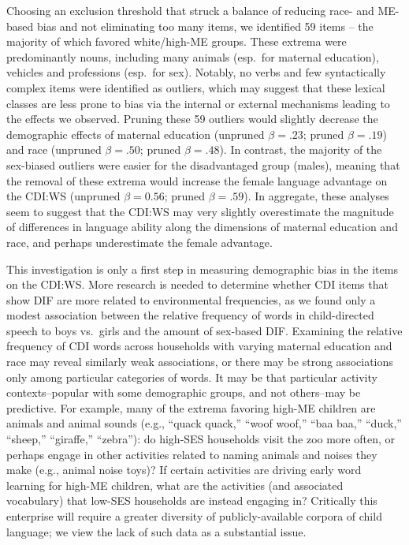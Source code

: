 \documentclass[10pt, letterpaper]{article}
\begin{document}
Choosing an exclusion threshold that struck a balance of reducing race-
and ME-based bias and not eliminating too many items, we identified 59
items -- the majority of which favored white/high-ME groups. These
extrema were predominantly nouns, including many animals (esp.~for
maternal education), vehicles and professions (esp.~for sex). Notably,
no verbs and few syntactically complex items were identified as
outliers, which may suggest that these lexical classes are less prone to
bias via the internal or external mechanisms leading to the effects we
observed. Pruning these 59 outliers would slightly decrease the
demographic effects of maternal education (unpruned \(\beta=.23\);
pruned \(\beta=.19\)) and race (unpruned \(\beta=.50\); pruned
\(\beta=.48\)). In contrast, the majority of the sex-biased outliers
were easier for the disadvantaged group (males), meaning that the
removal of these extrema would increase the female language advantage on
the CDI:WS (unpruned \(\beta=0.56\); pruned \(\beta=.59\)). In
aggregate, these analyses seem to suggest that the CDI:WS may very
slightly overestimate the magnitude of differences in language ability
along the dimensions of maternal education and race, and perhaps
underestimate the female advantage.

This investigation is only a first step in measuring demographic bias in
the items on the CDI:WS. More research is needed to determine whether
CDI items that show DIF are more related to environmental frequencies,
as we found only a modest association between the relative frequency of
words in child-directed speech to boys vs.~girls and the amount of
sex-based DIF. Examining the relative frequency of CDI words across
households with varying maternal education and race may reveal similarly
weak associations, or there may be strong associations only among
particular categories of words. It may be that particular activity
contexts--popular with some demographic groups, and not others--may be
predictive. For example, many of the extrema favoring high-ME children
are animals and animal sounds (e.g., ``quack quack,'' ``woof woof,''
``baa baa,'' ``duck,'' ``sheep,'' ``giraffe,'' ``zebra''): do high-SES
households visit the zoo more often, or perhaps engage in other
activities related to naming animals and noises they make (e.g., animal
noise toys)? If certain activities are driving early word learning for
high-ME children, what are the activities (and associated vocabulary)
that low-SES households are instead engaging in? Critically this
enterprise will require a greater diversity of publicly-available
corpora of child language; we view the lack of such data as a
substantial issue.
\end{document}
